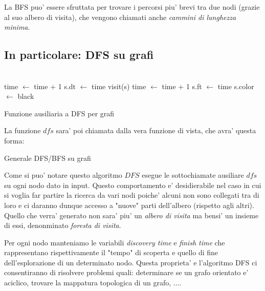 \documentclass{article}
\begin{document}
La BFS puo' essere sfruttata per trovare i percorsi piu' brevi tra due nodi (grazie
al suo albero di visita), che vengono chiamati anche \emph{cammini di lunghezza minima}.

\subsection{In particolare: DFS su grafi}

\begin{algorithm}[H]
  \Indm{}\\
  \Indp
  time $\leftarrow$ time + 1\;
  s.dt $\leftarrow$ time\;
  visit(s)\;
  time $\leftarrow$ time + 1\;
  s.ft $\leftarrow$ time\;
  s.color $\leftarrow$ black\;
  \caption{Funzione ausiliaria a DFS per grafi}
\end{algorithm}

La funzione $dfs$ sara' poi chiamata dalla vera funzione di vista, che avra' questa forma:

\begin{algorithm}[H]
  \caption{Generale DFS/BFS su grafi}
\end{algorithm}

Come si puo' notare questo algoritmo $DFS$ esegue le sottochiamate ausiliare $dfs$
su ogni nodo dato in input. Questo comportamento e' desidierabile nel caso in cui
si voglia far partire la ricerca da vari nodi poiche' alcuni non sono collegati
tra di loro e ci daranno dunque accesso a "nuove" parti dell'albero (rispetto
agli altri). Quello che verra' generato non sara' piu' un \emph{albero di visita}
ma bensi' un insieme di essi, denonminato \emph{foresta di visita}.

Per ogni nodo manteniamo le variabili \emph{discovery time} e \emph{finish time}
che rappresentano rispettivamente il "tempo" di scoperta e quello di fine
dell'esplorazione di un determinato nodo. Questa proprieta' e l'algoritmo DFS ci
consentiranno di risolvere problemi quali: determinare se un grafo orientato e'
aciclico, trovare la mappatura topologica di un grafo, $\ldots$.
\end{document}
